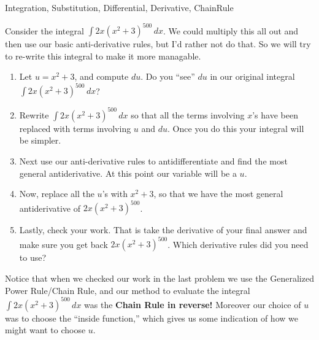 \begin{tagblock}{Integration, Substitution, Differential, Derivative, ChainRule }
\begin{question}

Consider the integral  $\displaystyle \int 2x(x^2+3)^{500} \, dx$.  We could multiply this all out and then use our basic anti-derivative rules, but I'd rather not do that.  So we will try to re-write this integral to make it more managable.
\begin{enumerate}
\item Let $u=x^2+3$, and compute $du$.  Do you ``see'' $du$ in our original integral $\displaystyle \int 2x(x^2+3)^{500} \, dx$?  

\vspace{.5in}
\item Rewrite $\displaystyle \int 2x(x^2+3)^{500} \, dx$ so that all the terms involving $x$'s have been replaced with terms involving $u$ and $du$.  Once you do this your integral will be simpler.

\vspace{1in}
\item Next use our anti-derivative rules to antidifferentiate and find the most general antiderivative.  At this point our variable will be a $u$.

\vspace{1in}
\item Now, replace all the $u$'s with $x^2+3$, so that we have the most general antiderivative of $2x(x^2+3)^{500}$.
\vspace{1in}
\item  Lastly, check your work.  That is take the derivative of your final answer and make sure you get back $2x(x^2+3)^{500}$.  Which derivative rules did you need to use?

\end{enumerate}


Notice that when we checked our work in the last problem we use the Generalized Power Rule/Chain Rule, and our method to evaluate the integral $\displaystyle \int 2x(x^2+3)^{500} \, dx$ was the \textbf{Chain Rule in reverse!}  Moreover our choice of $u$ was to choose the ``inside function,'' which gives us some indication of how we might want to choose $u$.   \bigskip


\end{question}
\end{tagblock}
